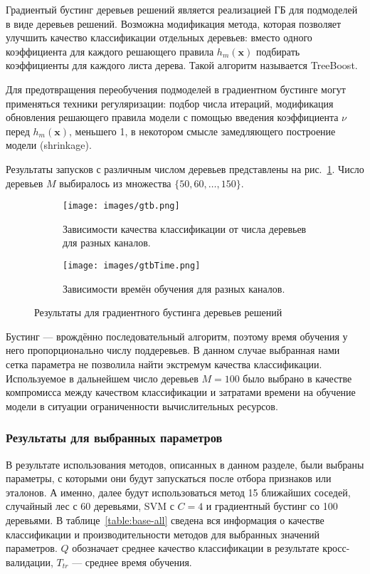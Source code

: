 Градиентый бустинг деревьев решений является реализацией ГБ для подмоделей в виде деревьев решений. Возможна модификация метода, которая позволяет улучшить качество классификации отдельных деревьев: вместо одного коэффициента для каждого решающего правила \(h_m(\mathbf{x})\) подбирать коэффициенты для каждого листа дерева. Такой алгоритм называется TreeBoost.

Для предотвращения переобучения подмоделей в градиентном бустинге могут применяться техники регуляризации: подбор числа итераций, модификация обновления решающего правила модели с помощью введения коэффициента \(\nu\) перед \(h_m(\mathbf{x})\), меньшего 1, в некотором смысле замедляющего построение модели (shrinkage).

Результаты запусков с различным числом деревьев представлены на рис.~\ref{fig:gtb-base}. Число деревьев \(M\) выбиралось из множества \(\{50,60,\dotsc,150\}\).
\begin{figure}[h!]
    \centering
	\begin{subfigure}{0.45\textwidth}
		\texttt{[image: images/gtb.png]}
		\caption{Зависимости качества классификации от числа деревьев для разных каналов.}
	\end{subfigure}
	\begin{subfigure}{0.45\textwidth}
		\texttt{[image: images/gtbTime.png]}
		\caption{Зависимости времён обучения для разных каналов.}
	\end{subfigure}
	\caption{Результаты для градиентного бустинга деревьев решений}\label{fig:gtb-base}
\end{figure}

Бустинг --- врождённо последовательный алгоритм, поэтому время обучения у него пропорционально числу поддеревьев. В данном случае выбранная нами сетка параметра не позволила найти экстремум качества классификации. Используемое в дальнейшем число деревьев \(M=100\) было выбрано в качестве компромисса между качеством классификации и затратами времени на обучение модели в ситуации ограниченности вычислительных ресурсов.

\subsubsection{Результаты для выбранных параметров}
В результате использования методов, описанных в данном разделе, были выбраны параметры, с которыми они будут запускаться после отбора признаков или эталонов. А именно, далее будут использоваться метод 15 ближайших соседей, случайный лес с 60 деревьями, SVM с \(C=4\) и градиентный бустинг со 100 деревьями. В таблице~\ref{table:base-all} сведена вся информация о качестве классификации и производительности методов для выбранных значений параметров. \(Q\) обозначает среднее качество классификации в результате кросс-валидации, \(T_{tr}\) --- среднее время обучения.

